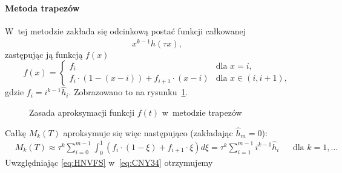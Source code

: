 \documentclass[paper=a4,DIV=12]{lpas}
\begin{document}
\begin{appendices}
  \paragraph{Metoda trapezów} W~tej metodzie zakłada się odcinkową postać
  funkcji całkowanej
  \begin{equation}
    x^{k-1} \hat{h}(\tau x),
    \label{eq:0MSTS}
  \end{equation}
  zastępując ją funkcją $f(x)$
  \begin{equation}
    f(x) = \begin{cases}
      f_i & \text{dla } x = i, \\
      f_i \cdot (1 - (x-i)) + f_{i+1} \cdot (x-i) & \text{dla } x \in (i, i+1),
    \end{cases}
  \end{equation}
  gdzie $f_i = i^{k-1} \hat{h}_i$. Zobrazowano to na rysunku~\ref{fig:Z319K}.
  \begin{figure}[H]
    \centering
    
    \caption{Zasada aproksymacji funkcji $f(t)$ w~metodzie trapezów}
    \label{fig:Z319K}
  \end{figure}
  Całkę $M_k(T)$ aproksymuje się więc następująco (zakładając $\hat{h}_m = 0$):
  \begin{equation}
    \begin{aligned}
      & M_k(T) \approx \tau^k \sum_{i=0}^{m-1} {\int_0^1 {\left(
        f_i \cdot (1 - \xi) + f_{i+1}\cdot \xi
      \right) d\xi}} = \tau^k \sum_{i=1}^{m-1} {i^{k-1} \hat{h}_i} &
      & \text{dla } k=1,\dots &
    \end{aligned}
    \label{eq:HNVFS}
  \end{equation}
  Uwzględniając \eqref{eq:HNVFS} w~\eqref{eq:CNY34} otrzymujemy
  \begin{equation}
    \begin{aligned}

\end{aligned}
\end{equation}
\end{appendices}
\end{document}
